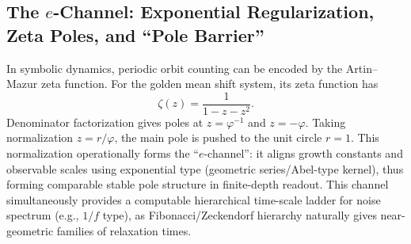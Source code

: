 \subsection{The $e$-Channel: Exponential Regularization, Zeta Poles, and ``Pole Barrier''}

In symbolic dynamics, periodic orbit counting can be encoded by the Artin--Mazur zeta function. For the golden mean shift system, its zeta function has
\[
\zeta(z)=\frac{1}{1-z-z^2}.
\]
Denominator factorization gives poles at $z=\varphi^{-1}$ and $z=-\varphi$. Taking normalization $z=r/\varphi$, the main pole is pushed to the unit circle $r=1$. This normalization operationally forms the ``$e$-channel'': it aligns growth constants and observable scales using exponential type (geometric series/Abel-type kernel), thus forming comparable stable pole structure in finite-depth readout. This channel simultaneously provides a computable hierarchical time-scale ladder for noise spectrum (e.g., $1/f$ type), as Fibonacci/Zeckendorf hierarchy naturally gives near-geometric families of relaxation times.
